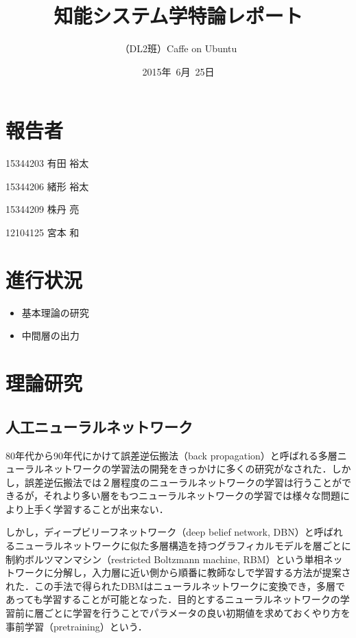 \documentclass[a4paper,10pt]{jsarticle}
\title{知能システム学特論レポート}
\author{
（DL2班）Caffe on Ubuntu\\
}
\date{2015年\ 6月\ 25日}
\begin{document}
\maketitle
\section{報告者}
\begin{list}{}{}
 \item 15344203\hspace{0.5cm} 有田 裕太
 \item 15344206\hspace{0.5cm} 緒形 裕太
 \item 15344209\hspace{0.5cm} 株丹 亮
 \item 12104125\hspace{0.5cm} 宮本 和
\end{list}

\section{進行状況}
\begin{itemize}
\item 基本理論の研究
\item 中間層の出力
\end{itemize}

\section{理論研究}
\subsection{人工ニューラルネットワーク}
80年代から90年代にかけて誤差逆伝搬法（back propagation）と呼ばれる多層ニューラルネットワークの学習法の開発をきっかけに多くの研究がなされた．しかし，誤差逆伝搬法では２層程度のニューラルネットワークの学習は行うことができるが，それより多い層をもつニューラルネットワークの学習では様々な問題により上手く学習することが出来ない．

しかし，ディープビリーフネットワーク（deep belief network, DBN）と呼ばれるニューラルネットワークに似た多層構造を持つグラフィカルモデルを層ごとに制約ボルツマンマシン（restricted Boltzmann machine, RBM）という単相ネットワークに分解し，入力層に近い側から順番に教師なしで学習する方法が提案された．この手法で得られたDBMはニューラルネットワークに変換でき，多層であっても学習することが可能となった．目的とするニューラルネットワークの学習前に層ごとに学習を行うことでパラメータの良い初期値を求めておくやり方を事前学習（pretraining）という．
\end{document}
